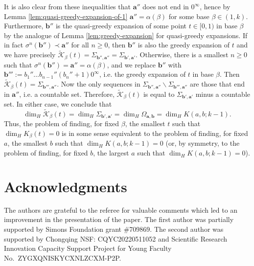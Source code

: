 \documentclass[12pt]{amsart}
\theoremstyle{definition}
\theoremstyle{remark}
\numberwithin{equation}{section}
\renewcommand{\a}{ {\mathbf{a}}}
\renewcommand{\b}{ {\mathbf{b}}}
\newcommand{\f}{\infty}
\newcommand{\al}{\alpha}
\newcommand{\lle}{\preccurlyeq}
\renewcommand{\a}{ \mathbf{a}}
\newcommand{\si}{\sigma}
\newcommand{\K}{\mathcal K}
\begin{document}
{\[\]
It is also clear from these inequalities that $\a''$ does not end in $0^\f$, hence by Lemma \ref{lem:quasi-greedy-expansion-of-1} $\a''=\al(\beta)$ for some base $\beta\in(1,k)$. Furthermore, $\b''$ is the quasi-greedy expansion of some point $t\in[0,1)$ in base $\beta$ by the analogue of Lemma \ref{lem:greedy-expansion} for quasi-greedy expansions. If in fact $\si^n(\b'')\prec \a''$ for all $n\geq 0$, then $\b''$ is also the greedy expansion of $t$ and we have precisely $\widetilde{\K}_\beta(t)=\Sigma_{\b'',\a''}=\Sigma_{\b',\a'}$. Otherwise, there is a smallest $n\geq 0$ such that $\si^n(\b'')=\a''=\al(\beta)$, and we replace $\b''$ with $\b''':=b_1''\dots b_{n-1}''(b_n''+1)0^\f$, i.e. the greedy expansion of $t$ in base $\beta$. Then $\widetilde{\K}_\beta(t)=\Sigma_{\b''',\a''}$. Now the only sequences in $\Sigma_{\b'',\a''}\backslash\Sigma_{\b''',\a''}$ are those that end in $\a''$, i.e. a countable set. Therefore, $\widetilde{\K}_\beta(t)$ is equal to $\Sigma_{\b',\a'}$ minus a countable set. In either case, we conclude that 
\[
\dim_H\widetilde{\K}_\beta(t)=\dim_H \Sigma_{\b',\a'}=\dim_H \Omega_{\a,\b}=\dim_H K(a,b;k-1).
\]
Thus, the problem of finding, for fixed $\beta$, the smallest $t$ such that $\dim_H K_\beta(t)=0$ is in some sense equivalent to the problem of finding, for fixed $a$, the smallest $b$ such that $\dim_H K(a,b;k-1)=0$ (or, by symmetry, to the problem of finding, for fixed $b$, the largest $a$ such that $\dim_H K(a,b;k-1)=0$).



\section*{Acknowledgments}
The authors are grateful to the referee for valuable comments which led to an improvement in the presentation of the paper.
The first author was partially supported by Simons Foundation grant \#709869.
The second author was supported by Chongqing NSF: CQYC20220511052 and Scientific Research Innovation Capacity Support Project for Young Faculty No.~ZYGXQNISKYCXNLZCXM-P2P.


}
\end{document}
